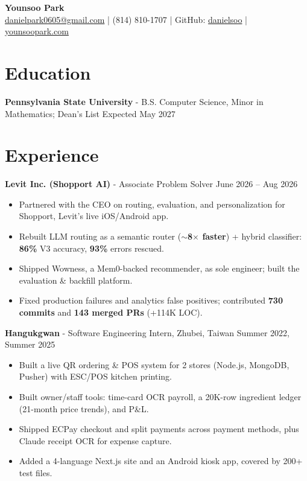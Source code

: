 \documentclass[11pt,a4paper]{article}
\newcommand{\blockspace}{\vspace{0.12em}}
\newenvironment{details}{\begin{itemize}[leftmargin=1.4em, label=\textbullet, topsep=0pt, itemsep=0pt, parsep=0pt, partopsep=0pt]}{\end{itemize}}
\begin{document}
\begin{center}
    {\LARGE \textbf{Younsoo Park}} \\
    \href{mailto:danielpark0605@gmail.com}{danielpark0605@gmail.com}
    \quad | \quad
    (814) 810-1707
    \quad | \quad
    GitHub:
    \href{https://github.com/danielsoo}{danielsoo}
    \quad | \quad
    \href{https://younsoopark.com}{younsoopark.com}
\end{center}

\section{Education}
\textbf{Pennsylvania State University} - B.S. Computer Science, Minor in Mathematics; Dean's List \hfill Expected May 2027

\section{Experience}
\noindent\textbf{Levit Inc. (Shopport AI)} - Associate Problem Solver \hfill June 2026 -- Aug 2026
\begin{details}
\item Partnered with the CEO on routing, evaluation, and personalization for Shopport, Levit's live iOS/Android app.
\item Rebuilt LLM routing as a semantic router (\textbf{$\sim$8$\times$ faster}) + hybrid classifier: \textbf{86\%} V3 accuracy, \textbf{93\%} errors rescued.
\item Shipped Wowness, a Mem0-backed recommender, as sole engineer; built the evaluation \& backfill platform.
\item Fixed production failures and analytics false positives; contributed \textbf{730 commits} and \textbf{143 merged PRs} (+114K LOC).
\end{details}
\blockspace

\noindent\textbf{Hangukgwan} - Software Engineering Intern, Zhubei, Taiwan \hfill Summer 2022, Summer 2025
\begin{details}
\item Built a live QR ordering \& POS system for 2 stores (Node.js, MongoDB, Pusher) with ESC/POS kitchen printing.
\item Built owner/staff tools: time-card OCR payroll, a 20K-row ingredient ledger (21-month price trends), and P\&L.
\item Shipped ECPay checkout and split payments across payment methods, plus Claude receipt OCR for expense capture.
\item Added a 4-language Next.js site and an Android kiosk app, covered by 200+ test files.
\end{details}
\blockspace
\end{document}
